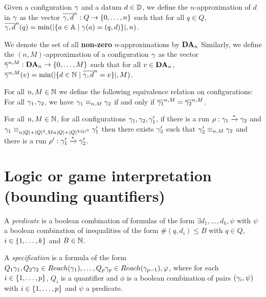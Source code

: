\documentclass[a4paper,UKenglish,cleveref, autoref, thm-restate]{lipics-v2021}
\begin{document}
	Given a configuration $\config$ and a datum $d \in \Dataset$, we define the $n$-approximation of $d$ in $\config$ as the vector $\dataapprox{n}{\config}{d} : Q \to \nset{0}{n}$ such that for all $q\in Q$, $\dataapprox{n}{\config}{d}(q)=\min(\size{\set{a \in \Agentset \mid \config(a)= (q,d)}},n)$.
	
	We denote the set of all \textbf{non-zero} $n$-approximations by $\DataApproxSet{n}$
	Similarly, we define the $(n,M)$-approximation of a configuration $\config$ as the vector $\configapprox{n}{M}{\config} : \DataApproxSet{n} \to \nset{0}{M}$ such that for all $v\in \DataApproxSet{n}$,
	$\configapprox{n}{M}{\config}(v) = \min(\size{\set{d \in \nats \mid \dataapprox{n}{\config}{d} = v}},M)$.
	
	
	For all $n, M \in \nats$ we define the following equivalence relation on configurations: 
	For all $\config_1, \config_2$, we have $\config_1 \equiv_{n,M} \config_2$ if and only if $\configapprox{n}{M}{\config_1} = \configapprox{n}{M}{\config_2}$.
	
	

	\begin{lemma}
		For all $n, M \in \nats$, for all configurations $\config_1, \config_2, \config_1'$, if there is a run $\run : \config_1 \xrightarrow{*} \config_2$ and $\config_1 \equiv_{n\size{Q}+\size{Q}^3,Mn\size{Q}+\size{Q}^{3\size{Q}^3}} \config'_1$ then there exists $\config'_2$ such that $\config'_2 \equiv_{n,M} \config_2$ and there is a run $\run' : \config_1' \xrightarrow{*} \config_2'$.
	\end{lemma}
	
	\section{Logic or game interpretation (bounding quantifiers)}
	
	\begin{definition}
		A \emph{predicate} is a boolean combination of formulas of the form $\exists d_1, \ldots, d_k, \psi$ with $\psi$ a boolean combination of inequalities of the form $\#(q,d_i) \leq B$ with $q\in Q$, $i \in \nset{1}{k}$ and $B \in \nats$.
		
		A \emph{specification} is a formula of the form $Q_1 \config_1, Q_2 \config_2  \in \Reach(\config_1), \ldots, Q_p \config_p \in \Reach(\config_{p-1}), \phi$, where for each $i \in \nset{1}{p}$, $Q_i$ is a quantifier and $\phi$ is a boolean combination of pairs $(\config_i, \psi)$ with $i \in \nset{1}{p}$ and $\psi$ a predicate.
	\end{definition}
\end{document}
